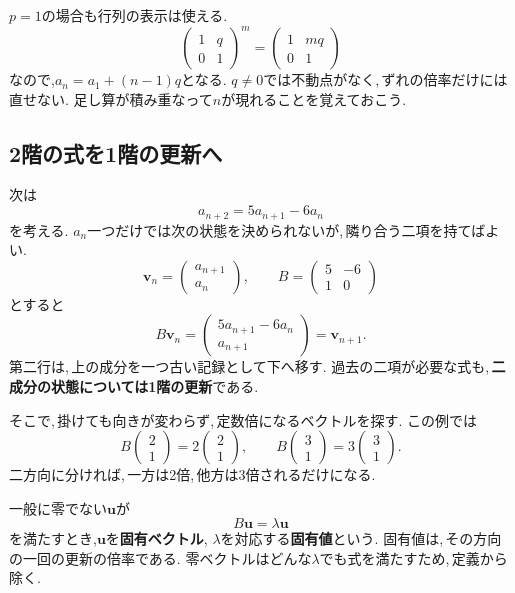 $p=1$の場合も行列の表示は使える.
\[
 \begin{pmatrix}1&q\\0&1\end{pmatrix}^{m}
 =\begin{pmatrix}1&mq\\0&1\end{pmatrix}
\]
なので,$a_n=a_1+(n-1)q$となる.
$q\ne0$では不動点がなく,\,ずれの倍率だけには直せない.
足し算が積み重なって$n$が現れることを覚えておこう.

\subsection{2階の式を1階の更新へ}

次は
\[
 a_{n+2}=5a_{n+1}-6a_n
\]
を考える.
$a_n$一つだけでは次の状態を決められないが,\,隣り合う二項を持てばよい.
\[
 \boldsymbol v_n=\begin{pmatrix}a_{n+1}\\a_n\end{pmatrix},
 \qquad B=\begin{pmatrix}5&-6\\1&0\end{pmatrix}
\]
とすると
\[
 B\boldsymbol v_n
 =\begin{pmatrix}5a_{n+1}-6a_n\\a_{n+1}\end{pmatrix}
 =\boldsymbol v_{n+1}.
\]
第二行は,\,上の成分を一つ古い記録として下へ移す.
過去の二項が必要な式も,\,\textbf{二成分の状態については1階の更新}である.

そこで,\,掛けても向きが変わらず,\,定数倍になるベクトルを探す.
この例では
\[
 B\begin{pmatrix}2\\1\end{pmatrix}
 =2\begin{pmatrix}2\\1\end{pmatrix},
 \qquad
 B\begin{pmatrix}3\\1\end{pmatrix}
 =3\begin{pmatrix}3\\1\end{pmatrix}.
\]
二方向に分ければ,\,一方は2倍,\,他方は3倍されるだけになる.

一般に零でない$\boldsymbol u$が
\[
 B\boldsymbol u=\lambda\boldsymbol u
\]
を満たすとき,$\boldsymbol u$を\textbf{固有ベクトル},
$\lambda$を対応する\textbf{固有値}という.
固有値は,\,その方向の一回の更新の倍率である.
零ベクトルはどんな$\lambda$でも式を満たすため,\,定義から除く.

